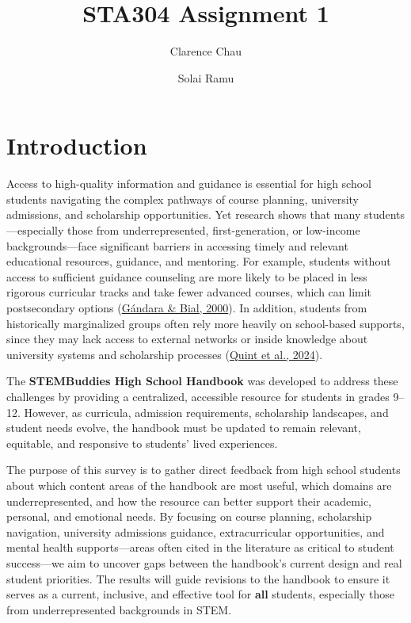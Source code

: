 \documentclass[
  letterpaper,
  DIV=11,
  numbers=noendperiod]{scrartcl}
\title{STA304 Assignment 1}
\author{Clarence Chau \and Solai Ramu}
\date{}
\begin{document}
\maketitle

\section{Introduction}\label{introduction}

Access to high-quality information and guidance is essential for high
school students navigating the complex pathways of course planning,
university admissions, and scholarship opportunities. Yet research shows
that many students---especially those from underrepresented,
first-generation, or low-income backgrounds---face significant barriers
in accessing timely and relevant educational resources, guidance, and
mentoring. For example, students without access to sufficient guidance
counseling are more likely to be placed in less rigorous curricular
tracks and take fewer advanced courses, which can limit postsecondary
options
(\href{https://journals.sagepub.com/doi/10.3102/00028312024002287}{Gándara
\& Bial, 2000}). In addition, students from historically marginalized
groups often rely more heavily on school-based supports, since they may
lack access to external networks or inside knowledge about university
systems and scholarship processes
(\href{https://earlycollegeresearch.uncg.edu/wp-content/uploads/2024/11/Career-Focused_Advising_report_FINAL.pdf}{Quint
et al., 2024}).

The \textbf{STEMBuddies High School Handbook} was developed to address
these challenges by providing a centralized, accessible resource for
students in grades 9--12. However, as curricula, admission requirements,
scholarship landscapes, and student needs evolve, the handbook must be
updated to remain relevant, equitable, and responsive to students' lived
experiences.

The purpose of this survey is to gather direct feedback from high school
students about which content areas of the handbook are most useful,
which domains are underrepresented, and how the resource can better
support their academic, personal, and emotional needs. By focusing on
course planning, scholarship navigation, university admissions guidance,
extracurricular opportunities, and mental health supports---areas often
cited in the literature as critical to student success---we aim to
uncover gaps between the handbook's current design and real student
priorities. The results will guide revisions to the handbook to ensure
it serves as a current, inclusive, and effective tool for \textbf{all}
students, especially those from underrepresented backgrounds in STEM.
\end{document}
